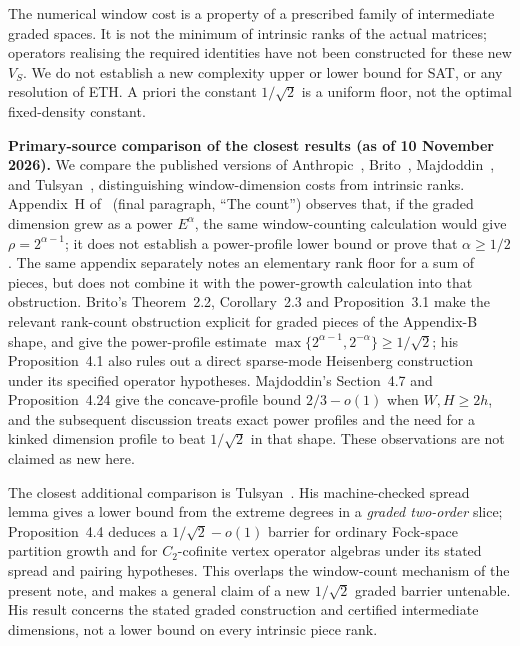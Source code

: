 \documentclass[10pt,a4paper]{article}
\numberwithin{equation}{section}
\theoremstyle{remark}\newtheorem{remark}[theorem]{Remark}\newtheorem{question}[theorem]{Question}
\begin{document}
The numerical window cost is a property of a prescribed family of intermediate graded spaces. It is not the minimum of intrinsic ranks of the actual matrices; operators realising the required identities have not been constructed for these new $V_S$. We do not establish a new complexity upper or lower bound for SAT, or any resolution of ETH. A priori the constant $1/\sqrt2$ is a uniform floor, not the optimal fixed-density constant.

\textbf{Primary-source comparison of the closest results (as of 10 November 2026).}
We compare the published versions of Anthropic~\cite{claude3sat},
Brito~\cite{brito}, Majdoddin~\cite{majdoddin}, and
Tulsyan~\cite{tulsyan}, distinguishing window-dimension costs from
intrinsic ranks. Appendix~H of~\cite{claude3sat} (final paragraph,
``The count'') observes that, if the graded dimension grew as a power
$E^\alpha$, the same window-counting calculation would give
$\rho=2^{\alpha-1}$; it does not establish a power-profile lower bound
or prove that $\alpha\ge1/2$. The same appendix separately notes an
elementary rank floor for a sum of pieces, but does not combine it with
the power-growth calculation into that obstruction. Brito's
Theorem~2.2, Corollary~2.3 and Proposition~3.1 make the relevant
rank-count obstruction explicit for graded pieces of the Appendix-B
shape, and give the power-profile estimate
$\max\{2^{\alpha-1},2^{-\alpha}\}\ge1/\sqrt2$; his Proposition~4.1
also rules out a direct sparse-mode Heisenberg construction under its
specified operator hypotheses. Majdoddin's Section~4.7 and
Proposition~4.24 give the concave-profile bound $2/3-o(1)$ when
$W,H\ge2h$, and the subsequent discussion treats exact power profiles
and the need for a kinked dimension profile to beat $1/\sqrt2$ in that
shape. These observations are not claimed as new here.

The closest additional comparison is Tulsyan~\cite[Section~4.2,
Theorem~4.3 and Proposition~4.4]{tulsyan}. His machine-checked
spread lemma gives a lower bound from the extreme degrees in a
\emph{graded two-order} slice; Proposition~4.4 deduces a
$1/\sqrt2-o(1)$ barrier for ordinary Fock-space partition growth
and for $C_2$-cofinite vertex operator algebras under its stated
spread and pairing hypotheses. This overlaps the window-count
mechanism of the present note, and makes a general claim of a new
$1/\sqrt2$ graded barrier untenable. His result concerns the stated
graded construction and certified intermediate dimensions, not a
lower bound on every intrinsic piece rank.
\end{document}
